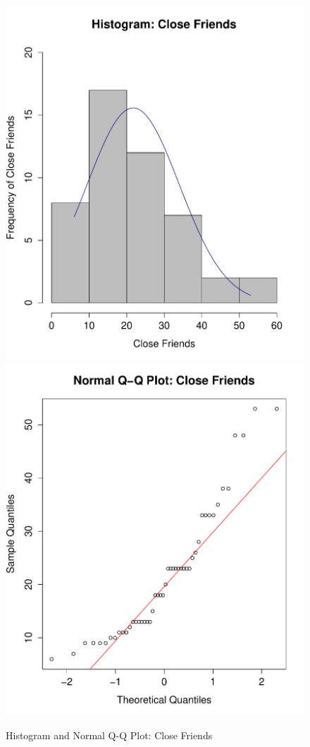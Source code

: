 \begin{figure}[H]
\caption{Histogram and Normal Q-Q Plot: Close Friends}
\centering
\includegraphics[scale=0.35]{./img/hist_closefriends.pdf}
\includegraphics[scale=0.35]{./img/qqplot_closefriends.pdf}
\end{figure}

